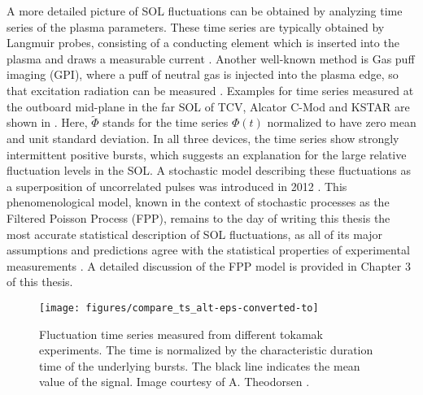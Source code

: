 A more detailed picture of SOL fluctuations can be obtained by analyzing time series of the plasma parameters. These time series are typically obtained by Langmuir probes, consisting of a conducting element which is inserted into the plasma and draws a measurable current \cite{langmuir1923positive,mott1926theory}. Another well-known method is Gas puff imaging (GPI), where a puff of neutral gas is injected into the plasma edge, so that excitation radiation can be measured \cite{zweben2017invited}. Examples for time series measured at the outboard mid-plane in the far SOL of TCV, Alcator C-Mod and KSTAR are shown in . Here, $\widetilde{\Phi}$ stands for the time series $\Phi(t)$ normalized to have zero mean and unit standard deviation. In all three devices, the time series show strongly intermittent positive bursts, which suggests an explanation for the large relative fluctuation levels in the SOL. A stochastic model describing these fluctuations as a superposition of uncorrelated pulses was introduced in 2012 \cite{garcia2012stochastic}. This phenomenological model, known in the context of stochastic processes as the Filtered Poisson Process (FPP), remains to the day of writing this thesis the most accurate statistical description of SOL fluctuations, as all of its major assumptions and predictions agree with the statistical properties of experimental measurements \cite{garcia2013intermittent,garcia2013burst,garcia2015intermittent,kube2016fluctuation,garcia2017sol,kube2018intermittent,garcia2018intermittent,theodorsen2018universality}. A detailed discussion of the FPP model is provided in Chapter 3 of this thesis.
\begin{figure}[t]
	\centering
	\texttt{[image: figures/compare\_ts\_alt-eps-converted-to]}
	\caption{Fluctuation time series measured from different tokamak experiments. The time is normalized by the characteristic duration time of the underlying bursts. The black line indicates the mean value of the signal. Image courtesy of A. Theodorsen \cite{theodorsen2018statistical}.}
	\label{Fig:time_series}
\end{figure}

